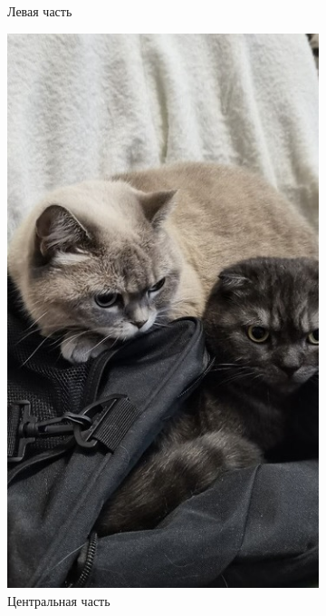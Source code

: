 \documentclass[a4paper, 16pt]{article}
\begin{document}
\begin{figure}[!htb]
\begin{subfigure}[b]{0.3\textwidth}
        \caption{Левая часть}
        \label{fig:left}
    \end{subfigure}
    \hfill
    \begin{subfigure}[b]{0.3\textwidth}
        \centering
        \includegraphics[width=\textwidth]{I2.jpg}
        \caption{Центральная часть}
        \label{fig:center}
    \end{subfigure}
    \hfill
    \begin{subfigure}[b]{0.3\textwidth}
        \centering

\end{subfigure}
\end{figure}
\end{document}
